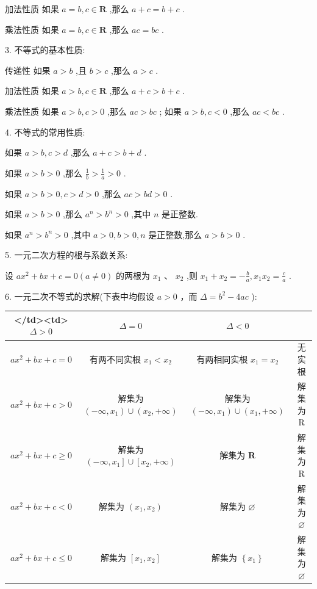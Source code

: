 \documentclass[a4paper,10pt,oneside,fontset=none]{ctexbook}
\renewcommand{\geq}{\geqslant}
\renewcommand{\leq}{\leqslant}
\numberwithin{equation}{chapter}
\begin{document}
加法性质 如果 $a = b, c \in  \mathbf{R}$ ,那么 $a + c = b + c$ .

乘法性质 如果 $a = b, c \in  \mathbf{R}$ ,那么 ${ac} = {bc}$ .

3. 不等式的基本性质:

传递性 如果 $a > b$ ,且 $b > c$ ,那么 $a > c$ .

加法性质 如果 $a > b, c \in  \mathbf{R}$ ,那么 $a + c > b + c$ .

乘法性质 如果 $a > b, c > 0$ ,那么 ${ac} > {bc}$ ; 如果 $a > b, c < 0$ ,那么 ${ac} < {bc}$ .

4. 不等式的常用性质:

如果 $a > b, c > d$ ,那么 $a + c > b + d$ .

如果 $a > b > 0$ ,那么 $\frac{1}{b} > \frac{1}{a} > 0$ .

如果 $a > b > 0, c > d > 0$ ,那么 ${ac} > {bd} > 0$ .

如果 $a > b > 0$ ,那么 ${a}^{n} > {b}^{n} > 0$ ,其中 $n$ 是正整数.

如果 ${a}^{n} > {b}^{n} > 0$ ,其中 $a > 0, b > 0, n$ 是正整数,那么 $a > b > 0$ .

5. 一元二次方程的根与系数关系:

设 $a{x}^{2} + {bx} + c = 0\left( {a \neq  0}\right)$ 的两根为 ${x}_{1}\text{ 、 }{x}_{2}$ ,则 ${x}_{1} + {x}_{2} =  - \frac{b}{a},{x}_{1}{x}_{2} = \frac{c}{a}$ .

6. 一元二次不等式的求解(下表中均假设 $a > 0$ ，而 $\Delta  = {b}^{2} - {4ac}$ ):

\begin{center}
\begin{tabular}{|c|c|c|c|}
\hline
</td><td>$\Delta  > 0$ & $\Delta  = 0$ & $\Delta  < 0$ \\\hline
$a{x}^{2} + {bx} + c = 0$ & 有两不同实根 ${x}_{1} < {x}_{2}$ & 有两相同实根 ${x}_{1} = {x}_{2}$ & 无实根 \\
$a{x}^{2} + {bx} + c > 0$ & 解集为 $\left( {-\infty ,{x}_{1}}\right)  \cup  \left( {{x}_{2}, + \infty }\right)$ & 解集为 $\left( {-\infty ,{x}_{1}}\right)  \cup  \left( {{x}_{1}, + \infty }\right)$ & 解集为 R \\
$a{x}^{2} + {bx} + c \geq  0$ & 解集为 $\left( {-\infty ,{x}_{1}}\right\rbrack   \cup  \left\lbrack  {{x}_{2}, + \infty }\right)$ & 解集为 $\mathbf{R}$ & 解集为 R \\
$a{x}^{2} + {bx} + c < 0$ & 解集为 $\left( {{x}_{1},{x}_{2}}\right)$ & 解集为 $\varnothing$ & 解集为 $\varnothing$ \\
$a{x}^{2} + {bx} + c \leq  0$ & 解集为 $\left\lbrack  {{x}_{1},{x}_{2}}\right\rbrack$ & 解集为 $\left\{  {x}_{1}\right\}$ & 解集为 $\varnothing$ \\
\hline
\end{tabular}
\end{center}
\end{document}
